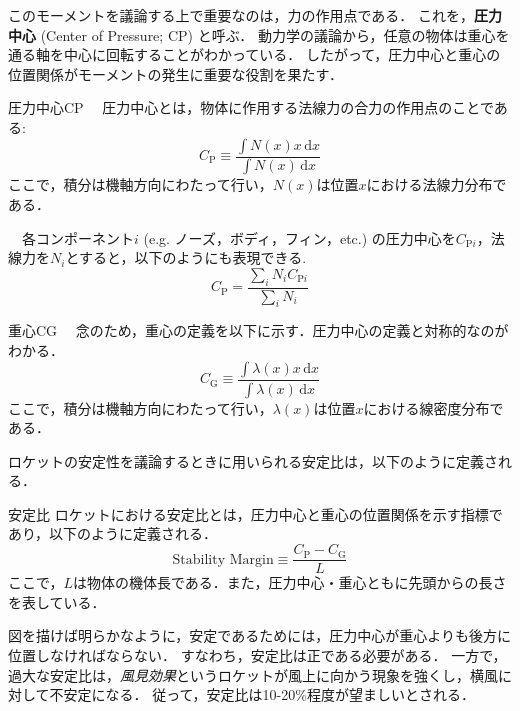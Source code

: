 \documentclass[uplatex,dvipdfmx,a4j,11pt]{jsreport}
\newcommand{\keyword}[1]{\textcolor{mainblue}{\textbf{#1}}}
\newcommand{\diff}{\mathrm{d}} %
\numberwithin{equation}{chapter}
\begin{document}
このモーメントを議論する上で重要なのは，力の作用点である．
これを，\keyword{圧力中心} (Center of Pressure; CP) と呼ぶ．
動力学の議論から，任意の物体は重心を通る軸を中心に回転することがわかっている．
したがって，圧力中心と重心の位置関係がモーメントの発生に重要な役割を果たす．
\begin{definition}{圧力中心}{CP}{}
  　圧力中心とは，物体に作用する法線力の合力の作用点のことである:
    \begin{equation}
      C_\mathrm{P} \equiv \frac{\int N(x)x\,\diff x}{\int N(x)\,\diff x}
    \end{equation}
  ここで，積分は機軸方向にわたって行い，$N(x)$は位置$x$における法線力分布である．

  　各コンポーネント$i$ (e.g. ノーズ，ボディ，フィン，etc.) の圧力中心を$C_{\mathrm{P}i}$，法線力を$N_i$とすると，以下のようにも表現できる.
  \begin{equation}
    C_\mathrm{P} = \frac{\sum_i N_i C_{\mathrm{P}i}}{\sum_i N_i}
  \end{equation}
\end{definition}

\begin{remark}{重心}{CG}{}
  　念のため，重心の定義を以下に示す．圧力中心の定義と対称的なのがわかる．
    \begin{equation}
      C_\mathrm{G} \equiv \frac{\int \lambda(x)x\,\diff x}{\int \lambda(x)\,\diff x}
    \end{equation}
  ここで，積分は機軸方向にわたって行い，$\lambda(x)$は位置$x$における線密度分布である．
\end{remark}

ロケットの安定性を議論するときに用いられる安定比は，以下のように定義される．
\begin{definition}{安定比}{}
  ロケットにおける安定比とは，圧力中心と重心の位置関係を示す指標であり，以下のように定義される．
    \begin{equation}
      \text{Stability Margin} \equiv \frac{C_\mathrm{P} - C_\mathrm{G}}{L}
    \end{equation}
  ここで，$L$は物体の機体長である．また，圧力中心・重心ともに先頭からの長さを表している．
\end{definition}
図を描けば明らかなように，安定であるためには，圧力中心が重心よりも後方に位置しなければならない．
すなわち，安定比は正である必要がある．
一方で，過大な安定比は，\emph{風見効果}というロケットが風上に向かう現象を強くし，横風に対して不安定になる．
従って，安定比は10-20\%程度が望ましいとされる．

\enskip
\end{document}
